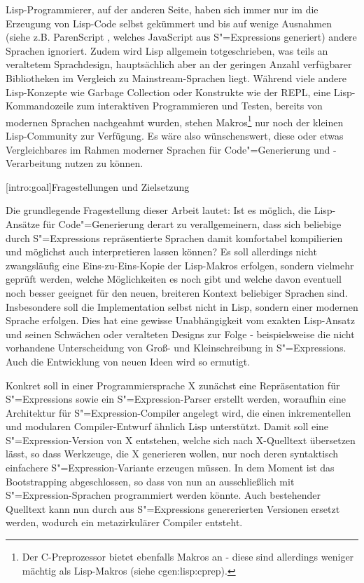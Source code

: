 \documentclass[a4paper, bibgerm]{book}
\newcommand\lsection{}
\newcommand\sref{}
\newcommand{\sees}[1]{(siehe \sref{#1})}
\newcommand{\sexp}{S"=Expression}
\newcommand{\sexps}{S"=Expressions}
\newcommand{\cgen}{Code"=Generierung}
\begin{document}
Lisp-Programmierer, auf der anderen Seite, haben sich immer nur im die
Erzeugung von Lisp-Code selbst gekümmert und bis auf wenige Ausnahmen
(siehe z.B. ParenScript \cite{TODO}, welches JavaScript aus \sexps{}
generiert) andere Sprachen ignoriert. Zudem wird Lisp allgemein
totgeschrieben, was teils an veraltetem Sprachdesign, hauptsächlich
aber an der geringen Anzahl verfügbarer Bibliotheken im Vergleich zu
Mainstream-Sprachen liegt. Während viele andere Lisp-Konzepte wie
Garbage Collection oder Konstrukte wie der REPL, eine
Lisp-Kommandozeile zum interaktiven Programmieren und Testen, bereits
von modernen Sprachen nachgeahmt wurden, stehen Makros\footnote{Der
  C-Preprozessor bietet ebenfalls Makros an - diese sind allerdings
  weniger mächtig als Lisp-Makros \sees{cgen:lisp:cprep}.} nur noch
der kleinen Lisp-Community zur Verfügung. Es wäre also wünschenswert,
diese oder etwas Vergleichbares im Rahmen moderner Sprachen für
\cgen{} und -Verarbeitung nutzen zu können.

\lsection[intro:goal]{Fragestellungen und Zielsetzung}

Die grundlegende Fragestellung dieser Arbeit lautet: Ist es möglich, die
Lisp-Ansätze für \cgen{} derart zu verallgemeinern, dass sich
beliebige durch \sexps{} repräsentierte Sprachen damit komfortabel
kompilierien und möglichst auch interpretieren lassen können? Es soll
allerdings nicht zwangsläufig eine Eins-zu-Eins-Kopie der Lisp-Makros
erfolgen, sondern vielmehr geprüft werden, welche Möglichkeiten es noch
gibt und welche davon eventuell noch besser geeignet für den neuen,
breiteren Kontext beliebiger Sprachen sind. Insbesondere soll die
Implementation selbst nicht in Lisp, sondern einer modernen Sprache
erfolgen. Dies hat eine gewisse Unabhängigkeit vom exakten Lisp-Ansatz
und seinen Schwächen oder veralteten Designs zur Folge -
beispielsweise die nicht vorhandene Unterscheidung von Groß- und
Kleinschreibung in \sexps{}. Auch die Entwicklung von neuen Ideen wird
so ermutigt.

Konkret soll in einer Programmiersprache X zunächst eine Repräsentation
für \sexps{} sowie ein \sexp{}-Parser erstellt werden, woraufhin eine
Architektur für \sexp{}-Compiler angelegt wird, die einen inkrementellen
und modularen Compiler-Entwurf ähnlich Lisp unterstützt. Damit soll eine
\sexp{}-Version von X entstehen, welche sich nach X-Quelltext übersetzen
lässt, so dass Werkzeuge, die X generieren wollen, nur noch deren
syntaktisch einfachere \sexp{}-Variante erzeugen müssen. In dem Moment ist
das Bootstrapping abgeschlossen, so dass von nun an ausschließlich mit
\sexp{}-Sprachen programmiert werden könnte. Auch bestehender Quelltext
kann nun durch aus \sexps{} genererierten Versionen ersetzt werden,
wodurch ein metazirkulärer Compiler entsteht.
\end{document}
